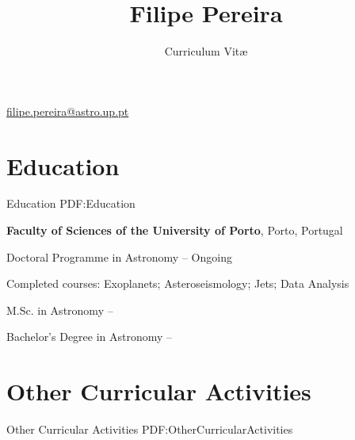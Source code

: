 \documentclass[letterpaper,10pt,oneside]{article}
\newcommand{\CVAuthor}{Filipe Pereira}
\newcommand{\CVTitle}{Curriculum Vit\ae}
\newcommand{\CVWebpage}{http://www.example.com/johndoe}
\begin{document}

\title{\CVAuthor}
\subtitle{\CVTitle}

\begin{subtitle}
\par
\href{mailto:filipe.pereira@astro.up.pt}
{filipe.pereira@astro.up.pt}
\end{subtitle}

\begin{body}


\section
{Education}
{Education}
{PDF:Education}

{\textbf{Faculty of Sciences of the University of Porto}},
Porto, Portugal

\GapNoBreak
\BulletItem
Doctoral Programme in Astronomy
\hfill
{} --
Ongoing
\begin{detail}
\SubBulletItem
Completed courses: Exoplanets; Asteroseismology; Jets; Data Analysis
\end{detail}

\GapNoBreak
\BulletItem
M.Sc. in Astronomy
\hfill
{} --


\GapNoBreak
\BulletItem
Bachelor's Degree in Astronomy
\hfill
{} --


\section
{Other Curricular Activities}
{Other Curricular Activities}
{PDF:OtherCurricularActivities}


\end{body}
\end{document}
